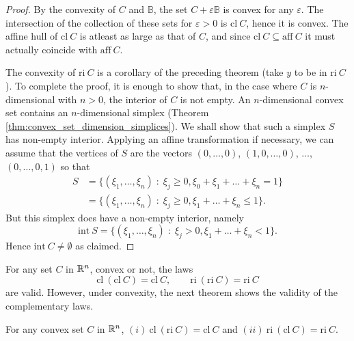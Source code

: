 \documentclass[11pt,a4paper]{article}
\begin{document}
\begin{proof}
    By the convexity of $C$ and $\mathbb{B}$, the set $C+\varepsilon\mathbb{B}$ is convex for any $\varepsilon$. The intersection of the collection of these sets for $\varepsilon>0$ is $\mathrm{cl}\ C$, hence it is convex. The affine hull of $\mathrm{cl}\ C$ is atleast as large as that of $C$, and since $\mathrm{cl}\ C\subseteq \mathrm{aff}\ C$ it must actually coincide with $\mathrm{aff}\ C$.

    The convexity of $\mathrm{ri}\ C$ is a corollary of the preceding theorem (take $y$ to be in $\mathrm{ri}\ C$). To complete the proof, it is enough to show that, in the case where $C$ is $n$-dimensional with $n>0$, the interior of $C$ is not empty. An $n$-dimensional convex set contains an $n$-dimensional simplex (Theorem \ref{thm:convex_set_dimension_simplices}). We shall show that such a simplex $S$ has non-empty interior. Applying an affine transformation if necessary, we can assume that the vertices of $S$ are the vectors $(0,\ldots,0)$, $(1,0,\ldots, 0)$, $\ldots$, $(0,\ldots, 0, 1)$ so that
    \begin{align*}
        S &= \{(\xi_1,\ldots, \xi_n)\;:\;\xi_{j}\ge 0, \xi_0+\xi_1+\ldots+\xi_n = 1\}\\
        &= \{(\xi_1,\ldots, \xi_n)\;:\;\xi_{j}\ge 0, \xi_1+\ldots+\xi_n \le 1\}.
    \end{align*}
    But this simplex does have a non-empty interior, namely 
    \begin{equation*}
        \mathrm{int}\ S = \{(\xi_1,\ldots, \xi_n)\;:\;\xi_{j}> 0, \xi_1+\ldots+\xi_n < 1\}.
    \end{equation*}
    Hence $\mathrm{int}\ C\neq \emptyset$ as claimed.
\end{proof}

\begin{remark}
    For any set $C$ in $\mathbb{R}^n$, convex or not, the laws
    \begin{equation*}
        \mathrm{cl}\ (\mathrm{cl}\ C) = \mathrm{cl}\ C,\qquad \mathrm{ri}\ (\mathrm{ri}\ C) = \mathrm{ri}\ C
    \end{equation*}
    are valid. However, under convexity, the next theorem shows the validity of the complementary laws.
\end{remark}

\begin{theorem}
    For any convex set $C$ in $\mathbb{R}^n$, $(i)\ \mathrm{cl}\ (\mathrm{ri}\ C) = \mathrm{cl}\ C$ and $(ii)\ \mathrm{ri}\ (\mathrm{cl}\ C) = \mathrm{ri}\ C$.
\end{theorem}
\end{document}
